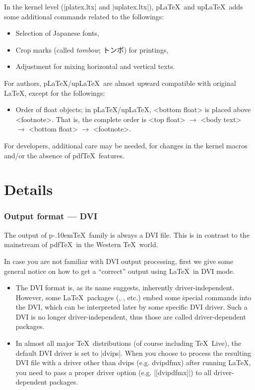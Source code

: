 \documentclass[a4paper,11pt,dvipdfmx]{article}
\def\Foreign#1{\textit{#1}}
\def\pTeX{p\kern-.10em\TeX}\def\upTeX{u\pTeX}
\def\pLaTeX{p\LaTeX}\def\upLaTeX{u\pLaTeX}
\def\pdfTeX{pdf\TeX}
\def\TL{\TeX\ Live\xspace}
\begin{document}
In the kernel level (|platex.ltx| and |uplatex.ltx|),
\pLaTeX\ and \upLaTeX\ adds some additional commands
related to the followings:
\begin{itemize}
  \item Selection of Japanese fonts,
  \item Crop marks (called \Foreign{tombow}; トンボ) for printings,
  \item Adjustment for mixing horizontal and vertical texts.
\end{itemize}
For authors, \pLaTeX/\upLaTeX\ are almost upward compatible with
original \LaTeX, except for the followings:
\begin{itemize}
  \item Order of float objects; in \pLaTeX/\upLaTeX,
    <bottom float> is placed above <footnote>.
    That is, the complete order is
    <top float> $\rightarrow$ <body text> $\rightarrow$
    <bottom float> $\rightarrow$ <footnote>.
\end{itemize}
For developers, additional care may be needed,
for changes in the kernel macros and/or the absence of \pdfTeX\ features.


\newpage


\part{Details}%

\section{Output format --- DVI}

The output of \pTeX\ family is always a DVI file.
This is in contrast to the mainstream of \pdfTeX\ in the Western \TeX\ world.

In case you are not familiar with DVI output processing,
first we give some general notice on how to get a ``correct'' output
using \LaTeX\ in DVI mode.

\begin{itemize}
  \item The DVI format is, as its name suggests, inherently driver-independent.
    However, some \LaTeX\ packages (, ,  etc.)
    embed some \.{special} commands into the DVI, which can be interpreted later
    by some specific DVI driver.
    Such a DVI is no longer driver-independent, thus those are called
    driver-dependent packages.
  \item In almost all major \TeX\ distributions (of course including \TL),
    the default DVI driver is set to |dvips|.
    When you choose to process the resulting DVI file with a driver
    other than dvips (e.g. dvipdfmx) after running \LaTeX,
    you need to pass a proper driver option (e.g. |[dvipdfmx]|) to
    all driver-dependent packages.
\end{itemize}
\end{document}
